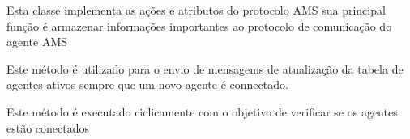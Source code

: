 \documentclass[letterpaper,10pt,brazil]{sphinxmanual}
\begin{document}
\begin{fulllineitems}
\label{api:pade.core.ams.AgentManagementFactory}
Esta classe implementa as ações e atributos do protocolo AMS
sua principal função é armazenar informações importantes ao protocolo de comunicação 
do agente AMS

\begin{fulllineitems}
\label{api:pade.core.ams.AgentManagementFactory.broadcast_message}
Este método é utilizado para o envio de mensagems de atualização da
tabela de agentes ativos sempre que um novo agente é connectado.

\end{fulllineitems}


\begin{fulllineitems}
\label{api:pade.core.ams.AgentManagementFactory.connection_test_send}
Este método é executado ciclicamente com o objetivo de
verificar se os agentes estão conectados

\end{fulllineitems}


\end{fulllineitems}

\end{document}
